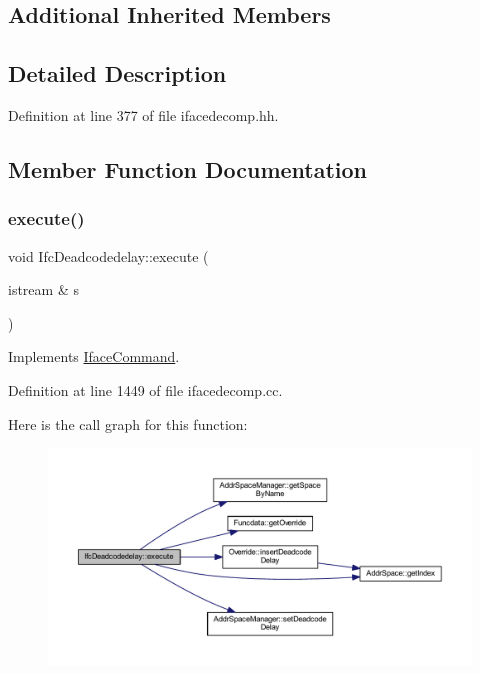 \subsection*{Additional Inherited Members}


\subsection{Detailed Description}


Definition at line 377 of file ifacedecomp.\+hh.



\subsection{Member Function Documentation}
\mbox{\label{class_ifc_deadcodedelay_ab3c538082471ef04a5cf0c48efd8a767}} 
\subsubsection{\texorpdfstring{execute()}{execute()}}
{\footnotesize\ttfamily void Ifc\+Deadcodedelay\+::execute (\begin{DoxyParamCaption}\item[{istream \&}]{s }\end{DoxyParamCaption})\hspace{0.3cm}{\ttfamily [virtual]}}



Implements \mbox{\hyperlink{class_iface_command_af10e29cee2c8e419de6efe9e680ad201}{Iface\+Command}}.



Definition at line 1449 of file ifacedecomp.\+cc.

Here is the call graph for this function\+:
\nopagebreak
\begin{figure}[H]
\begin{center}
\leavevmode
\includegraphics[width=350pt]{class_ifc_deadcodedelay_ab3c538082471ef04a5cf0c48efd8a767_cgraph}
\end{center}
\end{figure}


